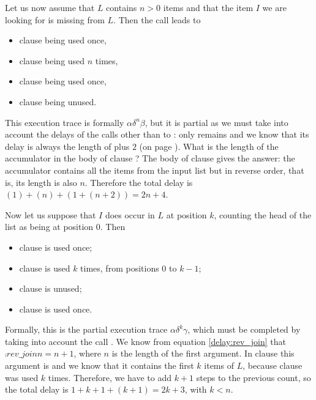 Let us now assume that \(L\) contains \(n > 0\) items and that the
item \(I\) we are looking for is missing from \(L\). Then the call
 leads to
\begin{itemize}

  \item clause \clause{\alpha} being used once,

  \item clause \clause{\delta} being used \(n\) times,

  \item clause \clause{\beta} being used once,

  \item clause \clause{\gamma} being unused.

\end{itemize}
This execution trace is formally \(\alpha\delta^n\beta\), but it is
partial as we must take into account the delays of the calls other
than to : only  remains and we know
that its delay is always the length of  plus \(2\) (on page
\pageref{delay:rev_join}). What is the length of the accumulator in
the body of clause \clause{\beta}? The body of clause \clause{\delta}
gives the answer: the accumulator contains all the items from the
input list but in reverse order, that is, its length is also
\(n\). Therefore the total delay is \((1)+(n)+(1+(n+2)) = 2n + 4\).

Now let us suppose that \(I\) does occur in \(L\) at position \(k\),
counting the head of the list as being at position \(0\). Then
\begin{itemize}

  \item clause \clause{\alpha} is used once;

  \item clause \clause{\delta} is used \(k\) times, from positions
    \(0\) to \(k-1\);

  \item clause \clause{\beta} is unused;

  \item clause \clause{\gamma} is used once.

\end{itemize}
Formally, this is the partial execution trace
\(\alpha\delta^k\gamma\), which must be completed by taking into
account the call . We know from equation
\eqref{delay:rev_join}  that
\(\comp{rev\_join}{n} = n + 1\), where \(n\) is the length of the
first argument. In clause \clause{\gamma} this argument is 
and we know that it contains the first \(k\) items of \(L\), because
clause \clause{\delta} was used \(k\) times. Therefore, we have to add
\(k+1\) steps to the previous count, so the total delay is \(1 + k + 1
+ (k+1) = 2k + 3\), with \(k < n\).

